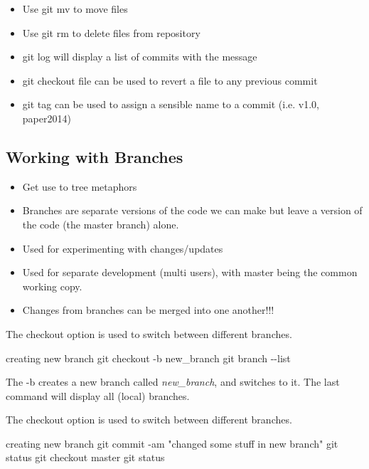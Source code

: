 \documentclass{beamer}
\begin{document}
\begin{frame}
\begin{itemize}
	\item Use \alert{git mv} to move files
	\item Use \alert{git rm} to delete files from repository
	\item \alert{git log} will display a list of commits with the message
	\item \alert{git checkout file} can be used to revert a file to any previous commit
	\item \alert{git tag} can be used to assign a sensible name to a commit (i.e. v1.0, paper2014)
\end{itemize}
\end{frame}



%
%
%

\subsection{Working with Branches}

\begin{frame}
\begin{itemize}
	\item Get use to tree metaphors
	\item Branches are separate versions of the code we can make but leave a version of the code (the master branch) alone.
	\item Used for experimenting with changes/updates
	\item Used for separate development (multi users), with master being the common working copy.
	\item Changes from branches can be merged into one another!!!
\end{itemize}
\end{frame}

\begin{frame}
The \alert{checkout} option is used to switch between different branches.
\begin{block}{creating new branch}
git checkout -b new\_branch \newline
git branch -{}-list
\end{block}
The \alert{-b} creates a new branch called \textit{new\_branch}, and switches to it. The last command will display all (local) branches.
\end{frame}

\begin{frame}
The \alert{checkout} option is used to switch between different branches.
\begin{block}{creating new branch}
git commit -am "changed some stuff in new branch"  \newline
git status \newline
git checkout master \newline
git status
\end{block}
\end{frame}
\end{document}
